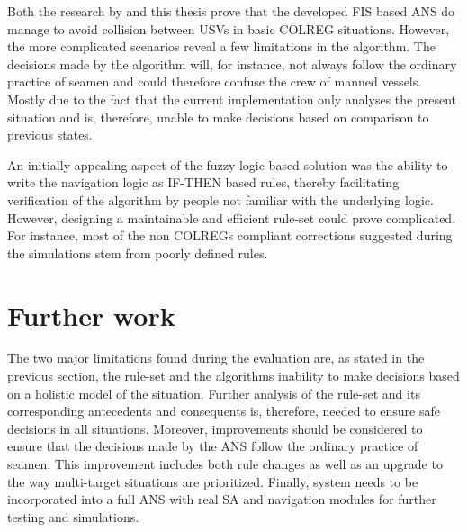 Both the research by \textcite{perera2012intelligent,perera2010smooth_param}  and this thesis prove that the developed FIS based ANS do manage to avoid collision between USVs in basic COLREG situations. However, the more complicated scenarios  reveal a few limitations in the algorithm. The decisions made by the algorithm will, for instance, not always follow the ordinary practice of seamen and could therefore confuse the crew of manned vessels. Mostly due to the fact that the current implementation  only analyses the present situation and is, therefore, unable to make decisions based on comparison to previous states.

An initially appealing aspect of the fuzzy logic based solution was the ability to write the navigation logic as IF-THEN based rules, thereby facilitating verification of the algorithm by people not familiar with the underlying logic. However, designing a maintainable and efficient  rule-set could prove complicated. For instance, most of the non COLREGs compliant corrections suggested during the simulations stem from poorly defined rules.






\section{Further work}%
The two major limitations found during the evaluation are, as stated in the previous section, the rule-set and the algorithms inability to make decisions based on a holistic model of the situation.
Further analysis of the rule-set and its corresponding antecedents and consequents is, therefore, needed to ensure safe decisions in all situations. Moreover, improvements should be considered to ensure that the decisions made by the ANS follow the ordinary practice of seamen. This improvement includes both rule changes as well as an upgrade to the way multi-target situations are prioritized.
Finally, system needs to be incorporated into a full ANS with real SA and navigation modules for further testing and simulations.
